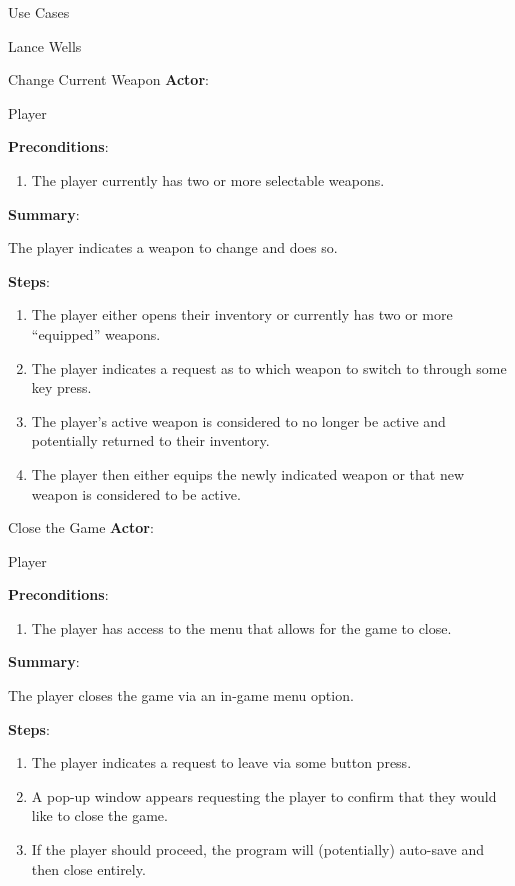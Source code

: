 \documentclass[12pt]{report}
\begin{document}
\begin{section}{Use Cases}
\begin{subsection}{Lance Wells}
\begin{subsubsection}{Change Current Weapon}
\textbf{Actor}:

Player

\textbf{Preconditions}:

\begin{enumerate}
\item The player currently has two or more selectable weapons.
\end{enumerate}

\textbf{Summary}:

The player indicates a weapon to change and does so.

\textbf{Steps}:

\begin{enumerate}
\item The player either opens their inventory or currently has two or more
``equipped'' weapons.
\item The player indicates a request as to which weapon to switch to through
some key press.
\item The player's active weapon is considered to no longer be active and
potentially returned to their inventory.
\item The player then either equips the newly indicated weapon or that new
weapon is considered to be active.
\end{enumerate}
\end{subsubsection}

\begin{subsubsection}{Close the Game}
\textbf{Actor}:

Player

\textbf{Preconditions}:

\begin{enumerate}
\item The player has access to the menu that allows for the game to close.
\end{enumerate}

\textbf{Summary}:

The player closes the game via an in-game menu option.

\textbf{Steps}:

\begin{enumerate}
\item The player indicates a request to leave via some button press.
\item A pop-up window appears requesting the player to confirm that they
would like to close the game.
\item If the player should proceed, the program will (potentially) auto-save
and then close entirely.
\end{enumerate}
\end{subsubsection}


\end{subsection}
\end{section}
\end{document}
